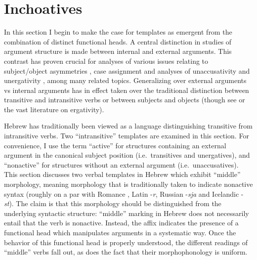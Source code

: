 %




\section{Inchoatives} \label{vz:inch}

In this section I begin to make the case for templates as emergent from the combination of distinct functional heads. A central distinction in studies of argument structure is made between internal and external arguments. This contrast has proven crucial for analyses of various issues relating to subject/object asymmetries \citep{marantz84,kratzer96}, case assignment \citep{burzio86,marantz91} and analyses of unaccusativity and unergativity \citep{perlmutter78}, among many related topics. Generalizing over external arguments vs internal arguments has in effect taken over the traditional distinction between transitive and intransitive verbs or between subjects and objects (though see \citealt{legate14}{ or the vast literature on ergativity}).{}

Hebrew has traditionally been viewed as a language distinguishing transitive from intransitive verbs. Two ``intransitive'' templates are examined in this section. For convenience, I use the term ``active'' for structures containing an external argument in the canonical subject position (i.e.~transitives and unergatives), and ``nonactive'' for structures without an external argument (i.e.~unaccusatives). This section discusses two verbal templates in Hebrew which exhibit ``middle'' morphology, meaning morphology that is traditionally taken to indicate nonactive syntax (roughly on a par with Romance , Latin -\emph{r}, Russian -\emph{sja} and Icelandic -\emph{st}). The claim is that this morphology should be {distinguished} from the underlying syntactic structure: ``middle'' marking in Hebrew does not necessarily entail that the verb is nonactive. Instead, the affix indicates the presence of a functional head which manipulates arguments in a systematic way. Once the behavior of this functional head is properly understood, the different readings of ``middle'' verbs fall out, as does the fact that their morphophonology is uniform.


